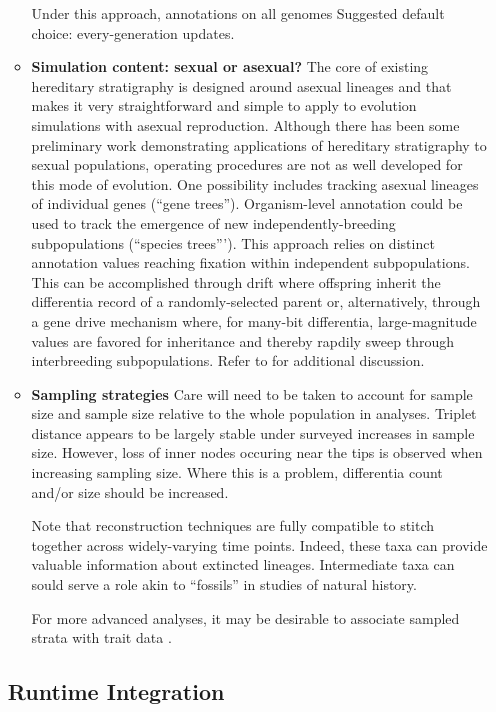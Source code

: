 \begin{enumerate}
\begin{itemize}
  Under this approach, annotations on all genomes
  Suggested default choice: every-generation updates.
\item \textbf{Simulation content: sexual or asexual?}
  The core of existing hereditary stratigraphy is designed around asexual lineages and that makes it very straightforward and simple to apply to evolution simulations with asexual reproduction.
  Although there has been some preliminary work demonstrating applications of hereditary stratigraphy to sexual populations, operating procedures are not as well developed for this mode of evolution.
  One possibility includes tracking asexual lineages of individual genes (``gene trees'').
  Organism-level annotation could be used to track the emergence of new independently-breeding subpopulations (``species trees''').
  This approach relies on distinct annotation values reaching fixation within independent subpopulations.
  This can be accomplished through drift where offspring inherit the differentia record of a randomly-selected parent or, alternatively, through a gene drive mechanism where, for many-bit differentia, large-magnitude values are favored for inheritance and thereby rapdily sweep through interbreeding subpopulations.
  Refer to \citep{moreno2024methods} for additional discussion.
\item \textbf{Sampling strategies}
Care will need to be taken to account for sample size and sample size relative to the whole population in analyses.
Triplet distance appears to be largely stable under surveyed increases in sample size.
However, loss of inner nodes occuring near the tips is observed when increasing sampling size.
Where this is a problem, differentia count and/or size should be increased.

Note that reconstruction techniques are fully compatible to stitch together across widely-varying time points.
Indeed, these taxa can provide valuable information about extincted lineages.
Intermediate taxa can sould serve a role akin to ``fossils'' in studies of natural history.

For more advanced analyses, it may be desirable to associate sampled strata with trait data \citep{TODOMODES,TODOCITEFROMJACOB}.

\end{itemize}

\subsection{Runtime Integration}


\end{enumerate}
